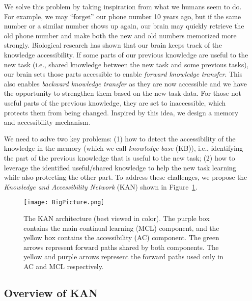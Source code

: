\documentclass[runningheads]{llncs}
\begin{document}
We solve this problem by taking inspiration from what we humans seem to do. For example, we may ``forget'' our phone number 10 years ago, but if the same number or a similar number shows up again, our brain may quickly retrieve the old phone number and make both the new and old numbers memorized more strongly. Biological research \cite{kornell2009unsuccessful} has shown that our brain keeps track of the knowledge accessibility. If some parts of our previous knowledge are useful to the new task (i.e., shared knowledge between the new task and some previous tasks), our brain sets those parts accessible to enable {\em forward knowledge transfer}. This also enables {\em backward knowledge transfer} as they are now accessible and we have the opportunity to strengthen them based on the new task data. For those not useful parts of the previous knowledge, they are set to inaccessible, which protects them from being changed. Inspired by this idea, we design a memory and accessibility mechanism. 

{\color{black}We need to solve two key problems}: (1) how to detect the accessibility of the knowledge in the memory (which we call \textit{knowledge base} (KB)), i.e., identifying the part of the previous knowledge that is useful to the new task; (2) how to leverage the identified useful/shared knowledge to help the new task learning while also protecting the other part. To address these challenges, we propose the \textit{Knowledge and Accessibility Network} (KAN) shown in Figure~\ref{overview}.


\begin{figure}[t]
\centering
\texttt{[image: BigPicture.png]} \vspace{-3mm}
\caption{The KAN architecture (best viewed in color). The purple box contains the main continual learning (MCL) component, and the yellow box contains the accessibility (AC) component. The green arrows represent forward paths shared by both components. The yellow and purple arrows represent the forward paths used only in AC and MCL respectively.}
\label{overview}
\vspace{-3mm}
\end{figure}

\subsection{Overview of KAN}
\end{document}
